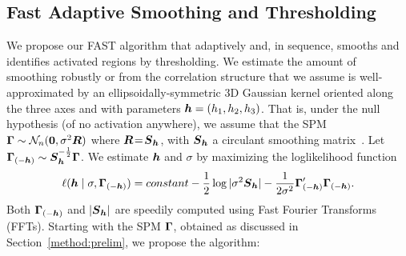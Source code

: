 \subsection{Fast Adaptive Smoothing and Thresholding}
\label{fast}
We propose our FAST algorithm that adaptively and, in sequence, smooths and
identifies activated regions by thresholding. We estimate the
amount of smoothing robustly or from the correlation structure that we
assume is well-approximated by an ellipsoidally-symmetric 3D Gaussian
kernel oriented along the three axes and with 
parameters $\boldsymbol{h}=(h_1,h_2,h_3)$. That is, under the 
null hypothesis (of no activation anywhere), we assume that the 
SPM $\boldsymbol{\Gamma}\sim \mathcal N_n(\boldsymbol{0}, \sigma^2\boldsymbol{R})$ where $\boldsymbol{R}\! =\! \boldsymbol{S}_{\boldsymbol{h}}$, with
$\boldsymbol{S}_{\boldsymbol{h}}$ a circulant smoothing matrix~\citep{maitraandosullivan98}.
Let $\boldsymbol{\Gamma}_{(-{\boldsymbol{h}})} \sim \boldsymbol{S}_{\boldsymbol{h}}^{-\frac12}\boldsymbol{\Gamma}$. We estimate
$\boldsymbol{h}$ and $\sigma$
by maximizing 
the loglikelihood function
\begin{equation}
  \label{llhd}
  \ell(\bh\mid\sigma,\bGamma_{(-\bh)}) = %
  constant -
  \frac12\log|\sigma^2\bS_{\bh}| - \frac1{2\sigma^2}\bGamma_{(-\bh)}'\bGamma_{(-\bh)}.
\end{equation}
Both $\boldsymbol{\Gamma}_{(-\boldsymbol{h})}$ and $|\boldsymbol{S}_{\boldsymbol{h}}|$ are
speedily computed using Fast Fourier Transforms (FFTs). 
Starting with the
SPM $\boldsymbol{\Gamma}$, obtained
as discussed in Section~\ref{method:prelim}, we  propose the algorithm:
